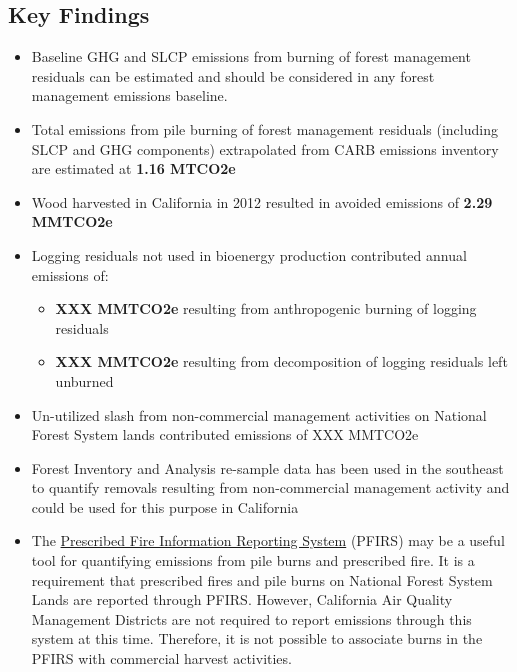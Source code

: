 \documentclass[a4paper]{article}
\begin{document}
\subsection{Key Findings}
\label{sec-1-2}
\begin{itemize}
\item Baseline GHG and SLCP emissions from burning of forest
management residuals can be estimated and should be considered in
any forest management emissions baseline.

\item Total emissions from pile burning of forest management residuals
(including SLCP and GHG components) extrapolated from CARB emissions
inventory are estimated at \textbf{1.16 MTCO2e}

\item Wood harvested in California in 2012 resulted in avoided emissions of
\textbf{2.29 MMTCO2e}

\item Logging residuals not used in bioenergy production contributed annual
emissions of:
\begin{itemize}
\item \textbf{XXX MMTCO2e} resulting from anthropogenic burning of logging residuals

\item \textbf{XXX MMTCO2e} resulting from decomposition of logging residuals left
unburned
\end{itemize}

\item Un-utilized slash from non-commercial management activities on
National Forest System lands contributed emissions of XXX MMTCO2e

\item Forest Inventory and Analysis re-sample data has been used in the
southeast to quantify removals resulting from non-commercial
management activity and could be used for this purpose in California

\item The \href{https://ssl.arb.ca.gov/pfirs/}{Prescribed Fire Information Reporting System} (PFIRS) may be a useful tool for quantifying
emissions from pile burns and prescribed fire. It is a requirement that prescribed fires and pile
burns on National Forest System Lands are reported through PFIRS. However, California Air Quality Management
Districts are not required to report emissions through this system at this time. Therefore, it is not possible to associate burns in the PFIRS with commercial harvest activities.
\end{itemize}
\end{document}
